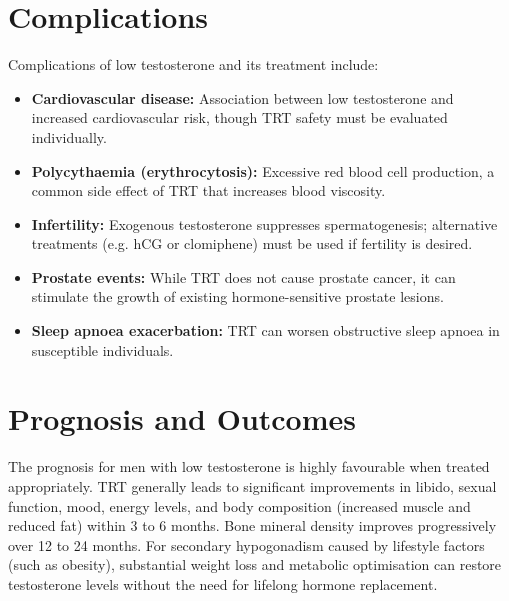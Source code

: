 \section*{Complications}
Complications of low testosterone and its treatment include:
\begin{itemize}
    \item \textbf{Cardiovascular disease:} Association between low testosterone and increased cardiovascular risk, though TRT safety must be evaluated individually.
    \item \textbf{Polycythaemia (erythrocytosis):} Excessive red blood cell production, a common side effect of TRT that increases blood viscosity.
    \item \textbf{Infertility:} Exogenous testosterone suppresses spermatogenesis; alternative treatments (e.g. hCG or clomiphene) must be used if fertility is desired.
    \item \textbf{Prostate events:} While TRT does not cause prostate cancer, it can stimulate the growth of existing hormone-sensitive prostate lesions.
    \item \textbf{Sleep apnoea exacerbation:} TRT can worsen obstructive sleep apnoea in susceptible individuals.
\end{itemize}

\section*{Prognosis and Outcomes}
The prognosis for men with low testosterone is highly favourable when treated appropriately. TRT generally leads to significant improvements in libido, sexual function, mood, energy levels, and body composition (increased muscle and reduced fat) within 3 to 6 months. Bone mineral density improves progressively over 12 to 24 months. For secondary hypogonadism caused by lifestyle factors (such as obesity), substantial weight loss and metabolic optimisation can restore testosterone levels without the need for lifelong hormone replacement.

